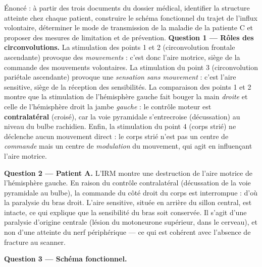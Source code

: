 \documentclass[11pt]{article}
\newcommand{\cle}[1]{{\popxbold\color{popdark}#1}}
\begin{document}
\begin{exoresolu}
Énoncé : à partir des trois documents du dossier médical, identifier la structure atteinte chez chaque patient, construire le schéma fonctionnel du trajet de l'influx volontaire, déterminer le mode de transmission de la maladie de la patiente C et proposer des mesures de limitation et de prévention.
\tcblower
\textbf{Question 1 — Rôles des circonvolutions.} La stimulation des points 1 et 2 (circonvolution frontale ascendante) provoque des \emph{mouvements} : c'est donc l'\cle{aire motrice}, siège de la commande des mouvements volontaires. La stimulation du point 3 (circonvolution pariétale ascendante) provoque une \emph{sensation sans mouvement} : c'est l'\cle{aire sensitive}, siège de la réception des sensibilités. La comparaison des points 1 et 2 montre que la stimulation de l'hémisphère gauche fait bouger la main \emph{droite} et celle de l'hémisphère droit la jambe \emph{gauche} : le contrôle moteur est \textbf{contralatéral} (croisé), car la voie pyramidale s'entrecroise (décussation) au niveau du bulbe rachidien. Enfin, la stimulation du point 4 (corps strié) ne déclenche aucun mouvement direct : le corps strié n'est pas un centre de \emph{commande} mais un centre de \emph{modulation} du mouvement, qui agit en influençant l'aire motrice.

\textbf{Question 2 — Patient A.} L'IRM montre une destruction de l'aire motrice de l'hémisphère gauche. En raison du contrôle contralatéral (décussation de la voie pyramidale au bulbe), la commande du côté droit du corps est interrompue : d'où la paralysie du bras droit. L'aire sensitive, située en arrière du sillon central, est intacte, ce qui explique que la sensibilité du bras soit conservée. Il s'agit d'une \cle{paralysie d'origine centrale} (lésion du motoneurone supérieur, dans le cerveau), et non d'une atteinte du nerf périphérique — ce qui est cohérent avec l'absence de fracture au scanner.

\textbf{Question 3 — Schéma fonctionnel.}


\end{exoresolu}
\end{document}
